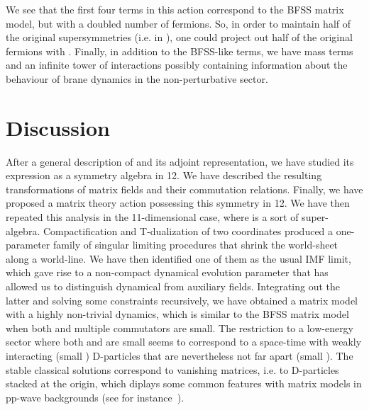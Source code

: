 \documentclass[a4paper,11pt]{article}
\def\G{{\Gamma}}
\begin{document}
We see that the first four terms in this action correspond to the BFSS matrix model, but with a doubled
number of fermions. So, in order to maintain half of the original supersymmetries (i.e. \coordHE{} in \coordHE{}), one could
project out half of the original fermions with \myHighlight{${\cal P}_{-}\xrightarrow{\text{IMF}}(1 + \tilde{\G}_{*})/2$}\coordHE{}. 
Finally, in addition to the BFSS-like terms, we have mass terms and an infinite tower of interactions possibly containing
information about the behaviour of brane dynamics in the non-perturbative sector.

\section{Discussion}

After a general description of \coordHE{} and its adjoint representation, we have studied its expression as
a symmetry algebra in 12\coordHE{}. We have described the resulting transformations of matrix fields and their commutation 
relations. Finally, we have proposed a matrix theory action possessing this symmetry in 12\coordHE{}. We have then repeated
this analysis in the 11-dimensional case, where \coordHE{} is a sort of super-\coordHE{} algebra.
Compactification and T-dualization of two coordinates produced a one-parameter family of singular limiting procedures 
that shrink the world-sheet along a world-line. We have then identified one of them as the usual IMF limit, which 
gave rise to a non-compact dynamical evolution parameter that has allowed us to distinguish dynamical from auxiliary
fields. Integrating out the latter and solving some constraints recursively, we have obtained a matrix
model with a highly non-trivial dynamics, which is similar to the BFSS matrix model when both \coordHE{} and multiple
commutators are small. The restriction to a low-energy sector where both \coordHE{} and \myHighlight{$[X,X]$}\coordHE{} are small seems 
to correspond to a space-time with weakly interacting (small \myHighlight{$[X,X]$}\coordHE{}) D-particles that are nevertheless not far apart
(small \coordHE{}). The stable classical solutions correspond to vanishing matrices, i.e. to D-particles stacked at 
the origin, which diplays some common features with matrix models in pp-wave backgrounds (see for 
instance~\cite{BMN,DSJvR,Bon}).
\end{document}

